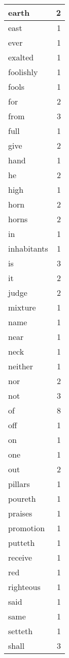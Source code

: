 \begin{center}
\begin{longtable}{l|r}
earth & 2 \\ \hline
east & 1 \\ \hline
ever & 1 \\ \hline
exalted & 1 \\ \hline
foolishly & 1 \\ \hline
fools & 1 \\ \hline
for & 2 \\ \hline
from & 3 \\ \hline
full & 1 \\ \hline
give & 2 \\ \hline
hand & 1 \\ \hline
he & 2 \\ \hline
high & 1 \\ \hline
horn & 2 \\ \hline
horns & 2 \\ \hline
in & 1 \\ \hline
inhabitants & 1 \\ \hline
is & 3 \\ \hline
it & 2 \\ \hline
judge & 2 \\ \hline
mixture & 1 \\ \hline
name & 1 \\ \hline
near & 1 \\ \hline
neck & 1 \\ \hline
neither & 1 \\ \hline
nor & 2 \\ \hline
not & 3 \\ \hline
of & 8 \\ \hline
off & 1 \\ \hline
on & 1 \\ \hline
one & 1 \\ \hline
out & 2 \\ \hline
pillars & 1 \\ \hline
poureth & 1 \\ \hline
praises & 1 \\ \hline
promotion & 1 \\ \hline
putteth & 1 \\ \hline
receive & 1 \\ \hline
red & 1 \\ \hline
righteous & 1 \\ \hline
said & 1 \\ \hline
same & 1 \\ \hline
setteth & 1 \\ \hline
shall & 3 \\ \hline

\end{longtable}
\end{center}
